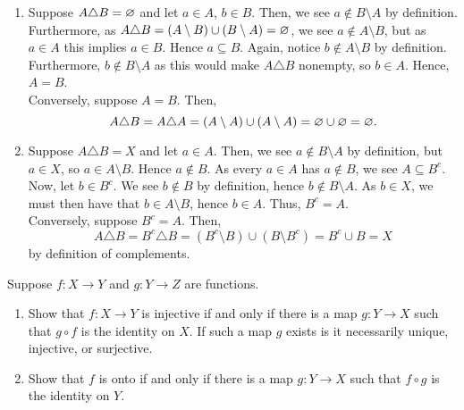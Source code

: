 \documentclass[a4paper]{article}
\begin{document}
\begin{solution}
	\begin{enumerate}
		\item Suppose \(A \triangle B = \varnothing\) and let \(a \in A\), \(b \in B\). Then, we see \(a \not\in B \setminus A\) by definition. Furthermore, as \(A \triangle B = \left( A\setminus B \right) \cup \left( B \setminus A \right)  = \varnothing\), we see \(a \not\in A \setminus B\), but as \(a \in A\) this implies \(a \in B\). Hence \(a \subseteq B\). Again, notice \(b \not\in A \setminus B\) by definition. Furthermore, \(b \not\in B \setminus A\) as this would make \(A\triangle B\) nonempty, so \(b \in A\). Hence, \(A=B\).\\
			Conversely, suppose \(A = B\). Then, \[
				A \triangle B = A \triangle A = \left( A \setminus A \right) \cup \left( A \setminus A \right)  = \varnothing \cup \varnothing = \varnothing
			.\]
		\item Suppose \(A\triangle B = X\) and let \(a \in A\). Then, we see \(a \not\in B \setminus A\) by definition, but \(a \in X\), so \( a \in A \setminus B\). Hence \(a \not\in B\). As every \(a \in A\) has \(a \not\in B\), we see \(A \subseteq B^{c}\). Now, let \(b \in B^{c}\). We see \(b \not\in B\) by definition, hence \(b \not\in B \setminus A\). As \(b \in X\), we must then have that \(b \in A \setminus B\), hence \(b \in A\). Thus, \(B^{c} = A\).\\
			Conversely, suppose \(B^{c} = A\). Then, \[
				A \triangle B = B^{c} \triangle B = \left( B^{c} \setminus B \right)  \cup \left( B \setminus B^{c} \right) = B^{c} \cup B = X
			\] by definition of complements.
	\end{enumerate}
\end{solution}
\newpage
\begin{problem}[3]
	Suppose \(f:X \to Y\) and \(g: Y\to Z\)  are functions.
	\begin{enumerate}
		\item Show that \(f:X \to Y\) is injective if and only if there is a map \(g: Y \to X\) such that \(g \circ f\) is the identity on \(X\). If such a map \(g\) exists is it necessarily unique, injective, or surjective.
			\item Show that \(f\) is onto if and only if there is a map \(g:Y \to X\) such that \(f \circ g\) is the identity on \(Y\).
	\end{enumerate}
\end{problem}
\end{document}
